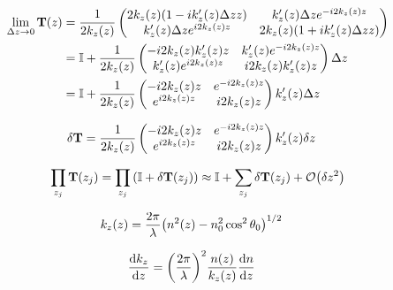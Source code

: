 \begin{align*}
	\lim_{\Delta z \to 0}\vb{T}\pqty{z} &= \frac{1}{2k_{z}\pqty{z}}\pmqty{
		2k_z\pqty{z}\pqty{1 - ik_z^\prime\pqty{z} \Delta z z} &
		k_z^\prime\pqty{z} \Delta z e^{-i2k_{z}\pqty{z}z}  \\
		k_z^\prime\pqty{z} \Delta z e^{i2k_{z}\pqty{z}z} &
		2k_z\pqty{z}\pqty{1 + ik_z^\prime\pqty{z} \Delta z z}
		}\\ &= 
		\mathbb{I} + \frac{1}{2k_{z}\pqty{z}}\pmqty{
		- i2k_z\pqty{z}k_z^\prime\pqty{z} z &
		k_z^\prime\pqty{z} e^{-i2k_{z}\pqty{z}z}  \\
		k_z^\prime\pqty{z} e^{i2k_{z}\pqty{z}z} &
		i2k_z\pqty{z}k_z^\prime\pqty{z} z
		} \Delta z \\
		&= 
		\mathbb{I} + \frac{1}{2k_{z}\pqty{z}}\pmqty{
		- i2k_z\pqty{z} z &
		 e^{-i2k_{z}\pqty{z}z}  \\
		 e^{i2k_{z}\pqty{z}z} &
		i2k_z\pqty{z} z
		}k_z^\prime\pqty{z} \Delta z
\end{align*}

\begin{align*}
	\delta\vb{T} &= \frac{1}{2k_{z}\pqty{z}}\pmqty{
		- i2k_z\pqty{z} z &
		 e^{-i2k_{z}\pqty{z}z}  \\
		 e^{i2k_{z}\pqty{z}z} &
		i2k_z\pqty{z} z
		}k_z^\prime\pqty{z} \delta z
\end{align*}

\begin{align*}
	\prod_{z_j }\vb{T}\pqty{z_j} = \prod_{z_j} \pqty{\mathbb{I} + \delta\vb{T}\pqty{z_j}} \approx \mathbb{I} + \sum_{z_j}\delta\vb{T}\pqty{z_j} + \mathcal{O}\pqty{\delta z^2}
\end{align*}

\begin{align*}
	k_{z}\pqty{z} &= \frac{2\pi }{\lambda}\pqty{n^2\pqty{z} - n_0^2\cos^2\theta_0}^{1/2}
\end{align*}

\begin{align*}
	\dv{k_z}{z} &= \pqty{\frac{2\pi }{\lambda}}^2 \frac{n\pqty{z}}{k_z\pqty{z}}\dv{n}{z}
\end{align*}


